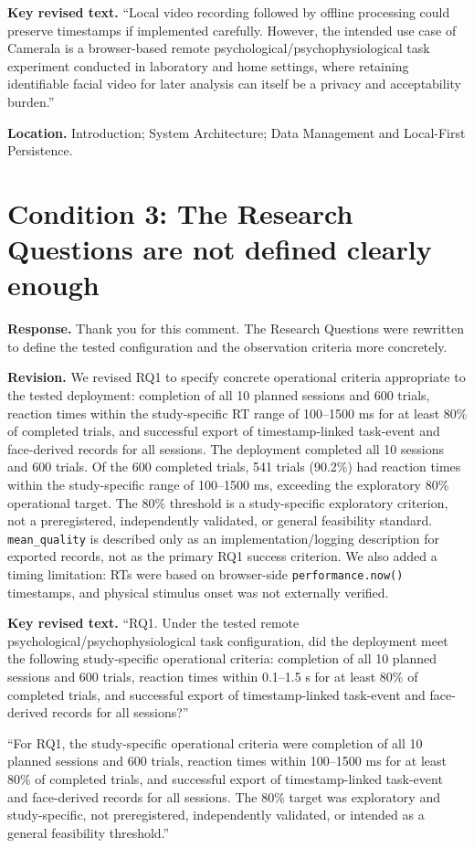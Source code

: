 \documentclass[11pt]{article}
\newcommand{\condition}[2]{\section*{Condition #1: #2}}
\begin{document}
\textbf{Key revised text.}
``Local video recording followed by offline processing could preserve timestamps if implemented carefully. However, the intended use case of Camerala is a browser-based remote psychological/psychophysiological task experiment conducted in laboratory and home settings, where retaining identifiable facial video for later analysis can itself be a privacy and acceptability burden.''

\textbf{Location.}
Introduction; System Architecture; Data Management and Local-First Persistence.

\condition{3}{The Research Questions are not defined clearly enough}
\textbf{Response.}
Thank you for this comment.
The Research Questions were rewritten to define the tested configuration and the observation criteria more concretely.

\textbf{Revision.}
We revised RQ1 to specify concrete operational criteria appropriate to the tested deployment: completion of all 10 planned sessions and 600 trials, reaction times within the study-specific RT range of 100--1500 ms for at least 80\% of completed trials, and successful export of timestamp-linked task-event and face-derived records for all sessions.
The deployment completed all 10 sessions and 600 trials.
Of the 600 completed trials, 541 trials (90.2\%) had reaction times within the study-specific range of 100--1500 ms, exceeding the exploratory 80\% operational target.
The 80\% threshold is a study-specific exploratory criterion, not a preregistered, independently validated, or general feasibility standard.
\texttt{mean\_quality} is described only as an implementation/logging description for exported records, not as the primary RQ1 success criterion.
We also added a timing limitation: RTs were based on browser-side \texttt{performance.now()} timestamps, and physical stimulus onset was not externally verified.

\textbf{Key revised text.}
``RQ1. Under the tested remote psychological/psychophysiological task configuration, did the deployment meet the following study-specific operational criteria: completion of all 10 planned sessions and 600 trials, reaction times within 0.1--1.5 s for at least 80\% of completed trials, and successful export of timestamp-linked task-event and face-derived records for all sessions?''

``For RQ1, the study-specific operational criteria were completion of all 10 planned sessions and 600 trials, reaction times within 100--1500 ms for at least 80\% of completed trials, and successful export of timestamp-linked task-event and face-derived records for all sessions. The 80\% target was exploratory and study-specific, not preregistered, independently validated, or intended as a general feasibility threshold.''
\end{document}
